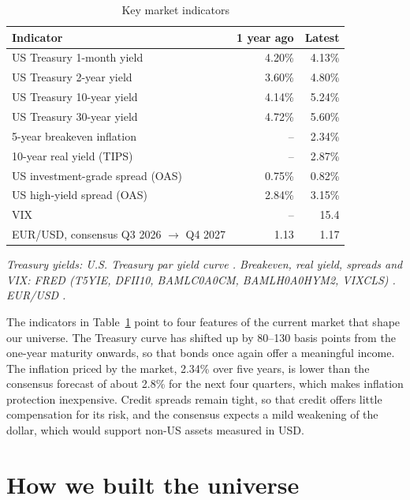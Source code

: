 \begin{table}[!htb]
\centering
\small
\caption{Key market indicators}\label{tab:indicators}
\begin{tabular}{@{}lrr@{}}
\toprule
Indicator & 1 year ago & Latest \\
\midrule
US Treasury 1-month yield & 4.20\% & 4.13\% \\
US Treasury 2-year yield & 3.60\% & 4.80\% \\
US Treasury 10-year yield & 4.14\% & 5.24\% \\
US Treasury 30-year yield & 4.72\% & 5.60\% \\
5-year breakeven inflation & -- & 2.34\% \\
10-year real yield (TIPS) & -- & 2.87\% \\
US investment-grade spread (OAS) & 0.75\% & 0.82\% \\
US high-yield spread (OAS) & 2.84\% & 3.15\% \\
VIX & -- & 15.4 \\
EUR/USD, consensus Q3 2026 $\rightarrow$ Q4 2027 & 1.13 & 1.17 \\
\bottomrule
\end{tabular}

\smallskip
\footnotesize\emph{Treasury yields: U.S. Treasury par yield curve \cite{ustreasury}. Breakeven,
real yield, spreads and VIX: FRED (T5YIE, DFII10, BAMLC0A0CM,
BAMLH0A0HYM2, VIXCLS) \cite{fred}. EUR/USD \cite{ecfc}.}
\end{table}

The indicators in Table~\ref{tab:indicators} point to four features of the current market
that shape our universe. The Treasury curve has shifted up by 80--130
basis points from the one-year maturity onwards, so that bonds once
again offer a meaningful income. The inflation priced by the market,
2.34\% over five years, is lower than the consensus forecast of about
2.8\% for the next four quarters, which makes inflation protection
inexpensive. Credit spreads remain tight, so that credit offers little
compensation for its risk, and the consensus expects a mild weakening of
the dollar, which would support non-US assets measured in USD.

\section*{How we built the universe}\label{sec:universe}

